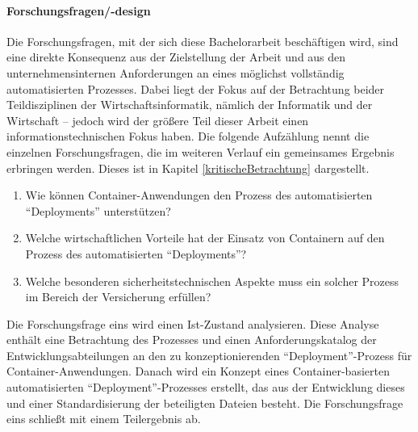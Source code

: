 \paragraph{Forschungsfragen/-design}\label{ffs}
Die Forschungsfragen, mit der sich diese Bachelorarbeit beschäftigen wird, sind eine direkte Konsequenz aus der Zielstellung der Arbeit und aus den unternehmensinternen Anforderungen an eines möglichst vollständig automatisierten Prozesses. Dabei liegt der Fokus auf der Betrachtung beider Teildisziplinen der Wirtschaftsinformatik, nämlich der Informatik und der Wirtschaft -- jedoch wird der größere Teil dieser Arbeit einen informationstechnischen Fokus haben. Die folgende Aufzählung nennt die einzelnen Forschungsfragen, die im weiteren Verlauf ein gemeinsames Ergebnis erbringen werden. Dieses ist in Kapitel \vref{kritischeBetrachtung} dargestellt.
\begin{enumerate}
	\item Wie können Container-Anwendungen den Prozess des automatisierten \enquote{Deployments} unterstützen?
	\item Welche wirtschaftlichen Vorteile hat der Einsatz von Containern auf den Prozess des automatisierten \enquote{Deployments}?
	\item Welche besonderen sicherheitstechnischen Aspekte muss ein solcher Prozess im Bereich der Versicherung erfüllen?
\end{enumerate}
Die Forschungsfrage eins wird einen Ist-Zustand analysieren. Diese Analyse enthält eine Betrachtung des Prozesses und einen Anforderungskatalog der Entwicklungsabteilungen an den zu konzeptionierenden \enquote{Deployment}-Prozess für Container-Anwendungen. Danach wird ein Konzept eines Container-basierten automatisierten \enquote{Deployment}-Prozesses erstellt, das aus der Entwicklung dieses und einer Standardisierung der beteiligten Dateien besteht. Die Forschungsfrage eins schließt mit einem Teilergebnis ab. \par

